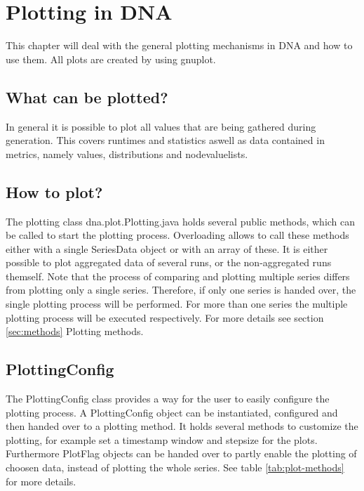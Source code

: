 \chapter{Plotting in DNA}
This chapter will deal with the general plotting mechanisms in DNA and how to use them. All plots are created by using gnuplot.

\section{What can be plotted?}
In general it is possible to plot all values that are being gathered during generation. This covers runtimes and statistics aswell as data contained in metrics, namely values, distributions and nodevaluelists.

\section{How to plot?}
The plotting class dna.plot.Plotting.java holds several public methods, which can be called to start the plotting process. Overloading allows to call these methods either with a single SeriesData object or with an array of these. It is either possible to plot aggregated data of several runs, or the non-aggregated runs themself. Note that the process of comparing and plotting multiple series differs from plotting only a single series. Therefore, if only one series is handed over, the single plotting process will be performed. For more than one series the multiple plotting process will be executed respectively. For more details see section \ref{sec:methods} Plotting methods.

\section{PlottingConfig}
The PlottingConfig class provides a way for the user to easily configure the plotting process. A PlottingConfig object can be instantiated, configured and then handed over to a plotting method. It holds several methods to customize the plotting, for example set a timestamp window and stepsize for the plots. Furthermore PlotFlag objects can be handed over to partly enable the plotting of choosen data, instead of plotting the whole series. See table \ref{tab:plot-methods} for more details.

